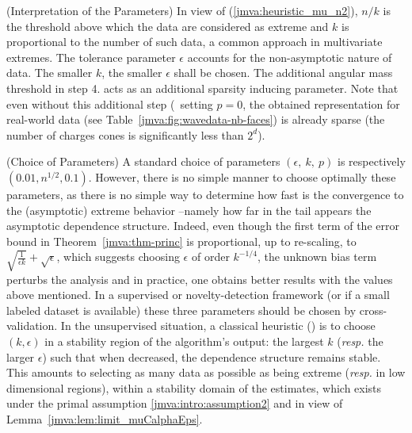 \begin{remark}({\sc Interpretation of the Parameters})
\label{jmva:rk_param_interpretation}
In view of %
(\ref{jmva:heuristic_mu_n2}), $n/k$ is the threshold above  which the data are
considered as extreme and $k$ is proportional to the number of such
data, a common approach in multivariate extremes.  %
The tolerance parameter $\epsilon$ accounts for the  non-asymptotic nature of data. The
smaller $k$, the smaller $\epsilon$ shall be chosen. 
The additional angular mass threshold in step 4. acts as an additional
sparsity inducing parameter. Note that even without this additional
step (\ie\ setting $p=0$, the obtained representation for
real-world data (see Table~\ref{jmva:fig:wavedata-nb-faces})  is 
already sparse (the number of charges cones is significantly less than
$2^d$). %
\end{remark}
\begin{remark}({\sc Choice of Parameters})
\label{jmva:rk_param_choice}
A standard choice of parameters $(\epsilon,~ k ,~ p)$ is
respectively 
$(0.01, n^{1/2}, 0.1)$. %
However, there is no simple manner to choose optimally these parameters, as there is no simple way to determine how fast is the convergence to the (asymptotic) extreme behavior --namely how far in the tail appears the asymptotic dependence structure. Indeed, even though the  first term of the  error bound in Theorem~\ref{jmva:thm-princ} is  proportional, up to re-scaling, to $\sqrt{\frac{1}{\epsilon k} }+ \sqrt{\epsilon}$, which suggests choosing $\epsilon$ of order $ k^{-1/4}$, the unknown bias term perturbs the analysis and in practice, one obtains better results with the values above mentioned. 
In a supervised or novelty-detection framework (or if a small labeled dataset is available) these three parameters should be chosen by cross-validation.
In the unsupervised situation, a classical heuristic
(\cite{Coles2001}) is to choose $(k, \epsilon)$ in a stability region
of the algorithm's output: the largest $k$ (\emph{resp.} the larger
$\epsilon$) such that when decreased, the dependence structure remains
stable. This amounts to selecting as many  data as possible as being
extreme (\emph{resp. } in  low dimensional regions), within a stability
domain of the estimates, which exists under the primal assumption
\eqref{jmva:intro:assumption2} and in view of Lemma~\ref{jmva:lem:limit_muCalphaEps}. %
\end{remark}
